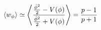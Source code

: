 \begin{equation}
\left< w_{\phi} \right> \simeq \left <{{ {\dot{\phi}^2 \over 2}-V(\phi)} \over {{\dot{\phi}^2 \over 2}+V(\phi)}} \right >={{p-1} \over{p+1}}
\label{stateeq}
\end{equation}

